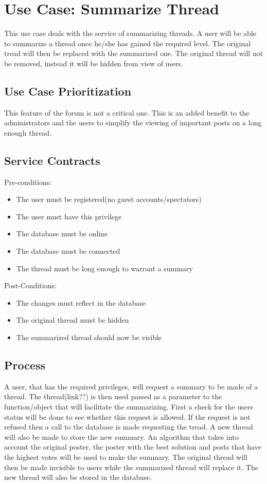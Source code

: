 \documentclass[a4paper,12pt]{article}
\begin{document}
\section{Use Case: Summarize Thread}
This use case deals with the service of summarizing threads. A user will be able to summarize a thread once he/she has gained the required level. The original tread will then be replaced with the summarized one. The original thread will not be removed, instead it will be hidden from view of users.
    
    
\subsection{Use Case Prioritization}
This feature of the forum is not a critical one. This is an added benefit to the administrators and the users to simplify the viewing of important posts on a long enough thread.
      
\subsection{Service Contracts}
Pre-conditions: 
\begin{itemize}
\item The user must be registered(no guest accounts/spectators)
\item The user must have this privilege
\item The database must be online
\item The database must be connected
\item The thread must be long enough to warrant a summary
\end{itemize}
      
Post-Conditions:
\begin{itemize}
\item The changes must reflect in the database
\item The original thread must be hidden
\item The summarized thread should now be visible
\end{itemize}
      
\subsection{Process}
A user, that has the required privileges, will request a summary to be made of a thread. The thread(link??) is then used passed as a parameter to the function/object that will facilitate the summarizing. First a check for the users status will be done to see whether this request is allowed. If the request is not refused then a call to the database is made requesting the tread. A new thread will also be made to store the new summary. An algorithm that takes into account the original poster, the poster with the best solution and posts that have the highest votes will be used to make the summary. The original thread will then be made invisible to users while the summarized thread will replace it. The new thread will also be stored in the database.
\end{document}
